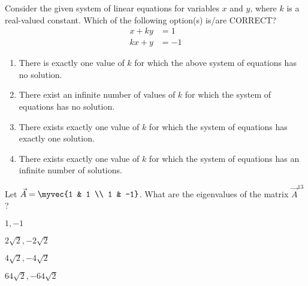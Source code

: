     \item Consider the given system of linear equations for variables $x$ and $y$, where $k$ is a real-valued constant. Which of the following option(s) is/are CORRECT?
    \hfill{}
    \begin{align*}
        x + ky &= 1 \\
        kx + y &= -1
    \end{align*}
    \begin{enumerate}
        \item There is exactly one value of $k$ for which the above system of equations has no solution.
        \item There exist an infinite number of values of $k$ for which the system of equations has no solution.
        \item There exists exactly one value of $k$ for which the system of equations has exactly one solution.
        \item There exists exactly one value of $k$ for which the system of equations has an infinite number of solutions.
    \end{enumerate}
    \item Let $\vec{A}
= \myvec{1 & 1 \\ 1 & -1} $.
    What are the eigenvalues of the matrix $\vec{A}^{13}$?
    \hfill{}
    \begin{enumerate}
        \begin{multicols}{4}
            \item $1, -1$
            \item $2\sqrt{2}, -2\sqrt{2}$
            \item $4\sqrt{2}, -4\sqrt{2}$
            \item $64\sqrt{2}, -64\sqrt{2}$
        \end{multicols}
    \end{enumerate}
